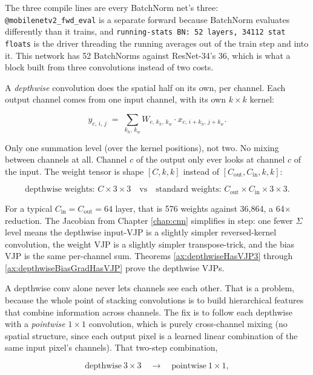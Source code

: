 The three compile lines are every BatchNorm net's three:
\texttt{@mobilenetv2\_fwd\_eval} is a separate forward because BatchNorm evaluates differently than it trains,
and \texttt{running-stats BN: 52 layers, 34112 stat floats} is the driver
threading the running averages out of the train step and into it. This
network has 52 BatchNorms against ResNet-34's 36, which is what a block
built from three convolutions instead of two costs.


A \emph{depthwise} convolution does the spatial half on its own,
per channel. Each output channel comes from one input channel, with
its own \(k \times k\) kernel:

\[
y_{c,\,i,\,j}
\;=\;
\sum_{k_h,\,k_w}
W_{c,\,k_h,\,k_w}
\cdot
x_{c,\,i+k_h,\,j+k_w}.
\]

Only one summation level (over the kernel positions), not two. No
mixing between channels at all. Channel \(c\) of the output only
ever looks at channel \(c\) of the input. The weight tensor is
shape \([C, k, k]\) instead of \([C_\text{out}, C_\text{in}, k, k]\):

\[
\text{depthwise weights: } C \times 3 \times 3
\quad\text{vs}\quad
\text{standard weights: } C_\text{out} \times C_\text{in} \times 3 \times 3.
\]

For a typical \(C_\text{in} = C_\text{out} = 64\) layer, that is 576
weights against 36{,}864, a 64$\times$ reduction. The Jacobian
from Chapter \ref{chap:cnn} simplifies in step: one fewer \(\Sigma\)
level means the depthwise input-VJP is a slightly simpler
reversed-kernel convolution, the weight VJP is a slightly simpler
transpose-trick, and the bias VJP is the same per-channel sum.
Theorems \ref{ax:depthwiseHasVJP3} through
\ref{ax:depthwiseBiasGradHasVJP} prove the depthwise VJPs.


A depthwise conv alone never lets channels see each other. That is
a problem, because the whole point of stacking convolutions is to
build hierarchical features that combine information across channels.
The fix is to follow each depthwise with a \emph{pointwise}
\(1 \times 1\) convolution, which is purely cross-channel mixing
(no spatial structure, since each output pixel is a learned linear
combination of the same input pixel's channels). That two-step
combination,

\[
\text{depthwise}\ 3 \times 3
\quad \longrightarrow \quad
\text{pointwise}\ 1 \times 1,
\]

